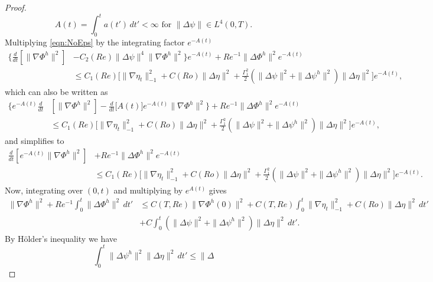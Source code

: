 \begin{proof}
  \begin{equation}
    A(t) = \int_{0}^{t}\! a(t')\, dt' < \infty \text{ for } \|\Delta \psi\| \in
      L^4(0,T).
    \label{eqn:L4Bound}
  \end{equation}
  Multiplying \eqref{eqn:NoEps} by the integrating factor $e^{-A(t)}$
  \begin{align*}
    \biggl\{ \frac{d}{dt}\left[\|\nabla \Phi^h\|^2\right]
      &- C_2(Re) \|\Delta \psi\|^4 \|\nabla \Phi^h\|^2\biggr\} e^{-A(t)}
       + Re^{-1} \|\Delta \Phi^h\|^2 e^{-A(t)} \\
    & \le C_1(Re) \biggl[\|\nabla \eta_t\|_{-1}^2
       + C(Ro) \|\Delta \eta\|^2 + \frac{\Gamma_1^2}{2}
      \left( \|\Delta \psi\|^2 +  \|\Delta \psi^h\|^2\right)
      \|\Delta \eta\|^2\biggr] e^{-A(t)},
  \end{align*}
  which can also be written as
  \begin{align*}
    \biggl\{ e^{-A(t)}\frac{d}{dt}
      & \left[\|\nabla \Phi^h\|^2\right]
      - \frac{d}{dt}\bigl[ A(t)\bigr] e^{-A(t)} \|\nabla \Phi^h\|^2\biggr\}
      + Re^{-1} \|\Delta \Phi^h\|^2 e^{-A(t)} \\
    & \le C_1(Re) \biggl[\|\nabla \eta_t\|_{-1}^2
      + C(Ro) \|\Delta \eta\|^2 + \frac{\Gamma_1^2}{2}
      \left( \|\Delta \psi\|^2 +  \|\Delta \psi^h\|^2\right)
      \|\Delta \eta\|^2\biggr] e^{-A(t)},
  \end{align*}
  and simplifies to
  \begin{align*}
    \frac{d}{dt}\left[e^{-A(t)} \|\nabla \Phi^h\|^2\right]
      &+ Re^{-1} \|\Delta \Phi^h\|^2 e^{-A(t)} \\
    & \le C_1(Re) \biggl[\|\nabla \eta_t\|_{-1}^2
      + C(Ro) \|\Delta \eta\|^2 + \frac{\Gamma_1^2}{2}
      \left( \|\Delta \psi\|^2 +  \|\Delta \psi^h\|^2\right)
      \|\Delta \eta\|^2\biggr] e^{-A(t)}.
  \end{align*}
  Now, integrating over $(0,t)$ and multiplying by $e^{A(t)}$ gives
  \begin{align*}
    \|\nabla \Phi^h\|^2 + Re^{-1} \int_0^t\! \|\Delta \Phi^h\|^2\, dt'
      & \le C(T,Re) \|\nabla \Phi^h(0)\|^2
      + C(T,Re) \int_0^t\! \|\nabla \eta_t\|_{-1}^2
      + C(Ro) \|\Delta \eta\|^2\, dt' \\
    & + C \int_0^t\!  \left( \|\Delta \psi\|^2 +  \|\Delta \psi^h\|^2\right)
      \|\Delta \eta\|^2\, dt'.
  \end{align*}
  By H\"older's inequality we have
  \begin{equation}
    \int_0^t\! \|\Delta \psi^h\|^2 \|\Delta \eta\|^2\, dt' \le \|\Delta

\end{equation}
\end{proof}
